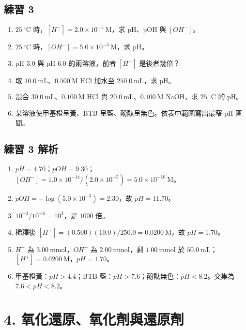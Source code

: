 \documentclass[11pt,a4paper]{article}
\providecommand{\tightlist}{%
  \setlength{\itemsep}{0pt}\setlength{\parskip}{0pt}}
\begin{document}
\subsection{練習 3}\label{ux7df4ux7fd2-3}

\begin{enumerate}
\def\labelenumi{\arabic{enumi}.}
\tightlist
\item
  \(25\ ^\circ\mathrm C\) 時，\([H^+]=2.0\times10^{-5}\ \mathrm M\)，求 pH、pOH 與 \([OH^-]\)。
\item
  \(25\ ^\circ\mathrm C\) 時，\([OH^-]=5.0\times10^{-3}\ \mathrm M\)，求 pH。
\item
  pH 3.0 與 pH 6.0 的兩溶液，前者 \([H^+]\) 是後者幾倍？
\item
  取 \(10.0\ \mathrm{mL}\)、\(0.500\ \mathrm M\) HCl 加水至 \(250.0\ \mathrm{mL}\)，求 pH。
\item
  混合 \(30.0\ \mathrm{mL}\)、\(0.100\ \mathrm M\) HCl 與 \(20.0\ \mathrm{mL}\)、\(0.100\ \mathrm M\) NaOH，求 \(25\ ^\circ\mathrm C\) 的 pH。
\item
  某溶液使甲基橙呈黃、BTB 呈藍、酚酞呈無色。依表中範圍寫出最窄 pH 區間。
\end{enumerate}

\subsection{練習 3 解析}\label{ux7df4ux7fd2-3-ux89e3ux6790}

\begin{enumerate}
\def\labelenumi{\arabic{enumi}.}
\tightlist
\item
  \(pH=4.70\)；\(pOH=9.30\)；\([OH^-]=1.0\times10^{-14}/(2.0\times10^{-5})=5.0\times10^{-10}\ \mathrm M\)。
\item
  \(pOH=-\log(5.0\times10^{-3})=2.30\)，故 \(pH=11.70\)。
\item
  \(10^{-3}/10^{-6}=10^3\)，是 \(1000\) 倍。
\item
  稀釋後 \([H^+]=(0.500)(10.0)/250.0=0.0200\ \mathrm M\)，故 \(pH=1.70\)。
\item
  \(H^+\) 為 \(3.00\ \mathrm{mmol}\)，\(OH^-\) 為 \(2.00\ \mathrm{mmol}\)，剩 \(1.00\ \mathrm{mmol}\) 於 \(50.0\ \mathrm{mL}\)；\([H^+]=0.0200\ \mathrm M\)，\(pH=1.70\)。
\item
  甲基橙黃：\(pH>4.4\)；BTB 藍：\(pH>7.6\)；酚酞無色：\(pH<8.2\)。交集為 \(7.6<pH<8.2\)。
\end{enumerate}

\section{4. 氧化還原、氧化劑與還原劑}\label{ux6c27ux5316ux9084ux539fux6c27ux5316ux5291ux8207ux9084ux539fux5291}
\end{document}
